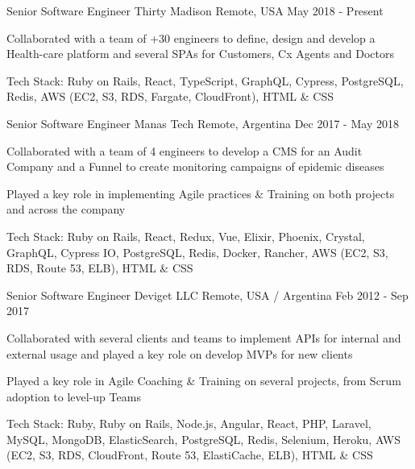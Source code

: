 
\begin{cventries}

  \cventry
    {Senior Software Engineer}
    {Thirty Madison}
    {Remote, USA}
    {May 2018 - Present}
    {
      \begin{cvitems}
        \item {Collaborated with a team of +30 engineers to define, design and develop a Health-care platform and several SPAs for Customers, Cx Agents and Doctors}
        \item {Tech Stack: Ruby on Rails, React, TypeScript, GraphQL, Cypress, PostgreSQL, Redis, AWS (EC2, S3, RDS, Fargate, CloudFront), HTML \& CSS}
      \end{cvitems}
    }

  \cventry
    {Senior Software Engineer}
    {Manas Tech}
    {Remote, Argentina}
    {Dec 2017 - May 2018}
    {
      \begin{cvitems}
        \item {Collaborated with a team of 4 engineers to develop a CMS for an Audit Company and a Funnel to create monitoring campaigns of epidemic diseases}
        \item {Played a key role in implementing Agile practices \& Training on both projects and across the company}
         \item {Tech Stack: Ruby on Rails, React, Redux, Vue, Elixir, Phoenix, Crystal, GraphQL, Cypress IO, PostgreSQL, Redis, Docker, Rancher, AWS (EC2, S3, RDS, Route 53, ELB), HTML \& CSS}
      \end{cvitems}
    }

  \cventry
    {Senior Software Engineer}
    {Deviget LLC}
    {Remote, USA / Argentina}
    {Feb 2012 - Sep 2017}
    {
      \begin{cvitems}
        \item {Collaborated with several clients and teams to implement APIs for internal and external usage and played a key role on develop MVPs for new clients}
        \item {Played a key role in Agile Coaching \& Training on several projects, from Scrum adoption to level-up Teams}
        \item {Tech Stack: Ruby, Ruby on Rails, Node.js, Angular, React, PHP, Laravel, MySQL, MongoDB, ElasticSearch, PostgreSQL, Redis, Selenium, Heroku, AWS (EC2, S3, RDS, CloudFront, Route 53, ElastiCache, ELB), HTML \& CSS}
      \end{cvitems}
    }


\end{cventries}
